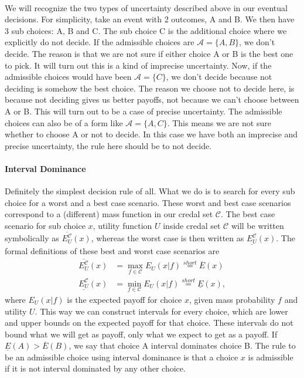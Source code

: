 \documentclass{report}
\theoremstyle{definition}
\begin{document}
\paragraph{}
We will recognize the two types of uncertainty described above in our eventual decisions. For simplicity, take an event with 2 outcomes, A and B. We then have 3 sub choices: A, B and C. The sub choice C is the additional choice where we explicitly do not decide. If the admissible choices are $\mathcal{A} = \{A,B \}$, we don't decide. The reason is that we are not sure if either choice A or B is the best one to pick. It will turn out this is a kind of imprecise uncertainty. Now, if the admissible choices would have been $\mathcal{A}=\{C\}$, we don't decide because not deciding is somehow the best choice. The reason we choose not to decide here, is because not deciding gives us better payoffs, not because we can't choose between A or B. This will turn out to be a case of precise uncertainty. The admissible choices can also be of a form like $\mathcal{A}=\{A,C\}$. This means we are not sure whether to choose A or not to decide. In this case we have both an imprecise and precise uncertainty, the rule here should be to not decide. 


\paragraph{Interval Dominance}
Definitely the simplest decision rule of all. What we do is to search for every sub choice for a worst and a best case scenario. These worst and best case scenarios correspond to a (different) mass function in our credal set $\mathcal{C}$. The best case scenario for sub choice $x$, utility function $U$ inside credal set $\mathcal{C}$ will be written symbolically as $\overline{E_U^{\mathcal{C}}}(x)$, whereas the worst case is then written as $\underline{E_U^{\mathcal{C}}}(x)$. The formal definitions of these best and worst case scenarios are \begin{equation}
\begin{split}
\overline{E_U^{\mathcal{C}}}(x) &= \max_{f \in \mathcal{C}} E_U(x|f) \overset{short}{=} \overline{E}(x)\\
\underline{E_U^{\mathcal{C}}}(x) &= \min_{f \in \mathcal{C}} E_U(x|f) \overset{short}{=} \underline{E}(x),
\end{split}
\end{equation}
where $E_U(x|f)$ is the expected payoff for choice $x$, given mass probability $f$ and utility $U$. This way we can construct intervals for every choice, which are lower and upper bounds on the expected payoff for that choice. These intervals do not bound what we will get as payoff, only what we expect to get as a payoff. If $\underline{E}(A)>\overline{E}(B)$, we say that choice A interval dominates choice B. The rule to be an admissible choice using interval dominance is that a choice $x$ is admissible if it is not interval dominated by any other choice.
\end{document}
